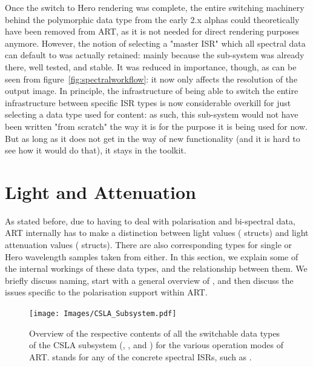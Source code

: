 Once the switch to Hero rendering was complete, the entire switching machinery behind the polymorphic  data type from the early 2.x alphas could theoretically have been removed from ART, as it is not needed for direct rendering purposes anymore. However, the notion of selecting a "master ISR" which all spectral data can default to was actually retained: mainly because the sub-system was already there, well tested, and stable. It was reduced in importance, though, as can be seen from figure~\ref{fig:spectralworkflow}: it now only affects the resolution of the output image. In principle, the infrastructure of being able to switch the entire  infrastructure between specific ISR types is now considerable overkill for just selecting a data type used for  content: as such, this sub-system would not have been written "from scratch" the way it is for the purpose it is being used for now. But as long as it does not get in the way of new functionality (and it is hard to see how it would do that), it stays in the toolkit.

\chapter{Light and Attenuation}
\label{sec:lightandattenuation}

As stated before, due to having to deal with polarisation and bi-spectral data, ART internally has to make a distinction between light values ( structs) and light attenuation values (
structs). There are also corresponding types for single or Hero wavelength samples taken from either. In this section, we explain some of the internal workings of these data types, and the relationship between them. We briefly discuss naming, start with a general overview of , and then discuss the issues specific to the polarisation support within ART.

\begin{figure}[htb]
\begin{center}
\texttt{[image: Images/CSLA\_Subsystem.pdf]} 
\end{center}
\caption{
\label{fig:csla_subsystem} 
Overview of the respective contents of all the switchable data types of the CSLA subsystem (, ,  and ) for the various operation modes of ART.  stands for any of the concrete spectral ISRs, such as \eg{}.
}
\end{figure}

